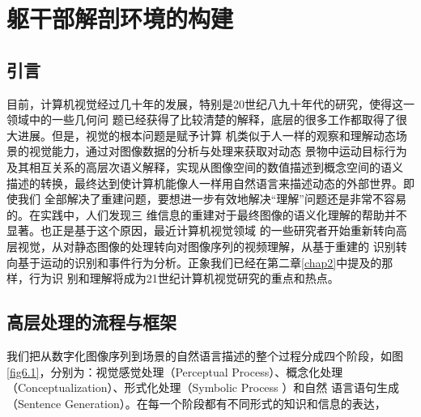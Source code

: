 \chapter{躯干部解剖环境的构建}
\label{chap6}
\section{引言}

目前，计算机视觉经过几十年的发展，特别是20世纪八九十年代的研究，使得这一领域中的一些几何问
题已经获得了比较清楚的解释，底层的很多工作都取得了很大进展。但是，视觉的根本问题是赋予计算
机类似于人一样的观察和理解动态场景的视觉能力，通过对图像数据的分析与处理来获取对动态
景物中运动目标行为及其相互关系的高层次语义解释，实现从图像空间的数值描述到概念空间的语义
描述的转换，最终达到使计算机能像人一样用自然语言来描述动态的外部世界。即使我们
全部解决了重建问题，要想进一步有效地解决“理解”问题还是非常不容易的。在实践中，人们发现三
维信息的重建对于最终图像的语义化理解的帮助并不显著。也正是基于这个原因，最近计算机视觉领域
的一些研究者开始重新转向高层视觉，从对静态图像的处理转向对图像序列的视频理解，从基于重建的
识别转向基于运动的识别和事件行为分析。正象我们已经在第二章\ref{chap2}中提及的那样，行为识
别和理解将成为21世纪计算机视觉研究的重点和热点\cite{Mubarak:2002}。

\section{高层处理的流程与框架}
\label{sec6.2}
我们把从数字化图像序列到场景的自然语言描述的整个过程分成四个阶段，如图\ref{fig6.1}，分别为：视觉感觉处理（Perceptual
Process）、概念化处理（Conceptualization）、形式化处理（Symbolic Process ）和自然
语言语句生成（Sentence Generation）。在每一个阶段都有不同形式的知识和信息的表达，
